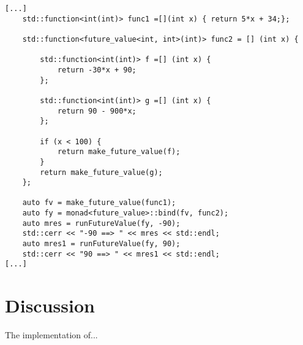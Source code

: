 \documentclass[12pt,fleqn]{article}
\begin{document}
\begin{minipage}{\linewidth}
\begin{lstlisting}[caption=Monad for the future value ,label=fvmonadexamp]
[...]
	std::function<int(int)> func1 =[](int x) { return 5*x + 34;};	

	std::function<future_value<int, int>(int)> func2 = [] (int x) {

		std::function<int(int)> f =[] (int x) {
			return -30*x + 90;
		};

		std::function<int(int)> g =[] (int x) {
			return 90 - 900*x;
		};

		if (x < 100) {
			return make_future_value(f);
		}
		return make_future_value(g);
	};

	auto fv = make_future_value(func1);
	auto fy = monad<future_value>::bind(fv, func2);
	auto mres = runFutureValue(fy, -90);
	std::cerr << "-90 ==> " << mres << std::endl;
	auto mres1 = runFutureValue(fy, 90);
	std::cerr << "90 ==> " << mres1 << std::endl;
[...]
\end{lstlisting}
\end{minipage}


\section{Discussion}

 The implementation of...
\end{document}
